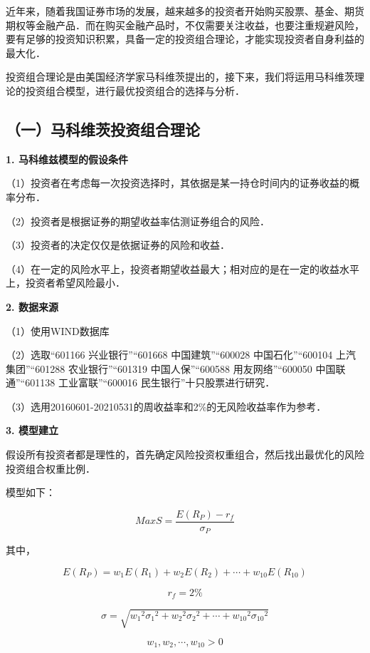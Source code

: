 
近年来，随着我国证券市场的发展，越来越多的投资者开始购买股票、基金、期货期权等金融产品．而在购买金融产品时，不仅需要关注收益，也要注重规避风险，要有足够的投资知识积累，具备一定的投资组合理论，才能实现投资者自身利益的最大化．

投资组合理论是由美国经济学家马科维茨提出的，接下来，我们将运用马科维茨理论的投资组合模型，进行最优投资组合的选择与分析．

\subsection{（一）马科维茨投资组合理论}

\textbf{1. 马科维兹模型的假设条件}

（1）投资者在考虑每一次投资选择时，其依据是某一持仓时间内的证券收益的概率分布．

（2）投资者是根据证券的期望收益率估测证券组合的风险．

（3）投资者的决定仅仅是依据证券的风险和收益．

（4）在一定的风险水平上，投资者期望收益最大；相对应的是在一定的收益水平上，投资者希望风险最小．

\textbf{2.	数据来源}

（1）使用WIND数据库

（2）选取“601166 兴业银行”“601668 中国建筑”“600028 中国石化”“600104 上汽集团”“601288 农业银行”“601319 中国人保”“600588 用友网络”“600050 中国联通”“601138 工业富联”“600016 民生银行”十只股票进行研究．

（3）选用20160601-20210531的周收益率和2\%的无风险收益率作为参考．

\textbf{3.	模型建立}

假设所有投资者都是理性的，首先确定风险投资权重组合，然后找出最优化的风险投资组合权重比例．

模型如下：

\begin{equation}
Max S=\frac {E(R_P)-r_f}{\sigma_P}
\end{equation}

其中，

\begin{equation}
E(R_P)=w_1E(R_1)+w_2E(R_2)+\cdots+w_{10}E(R_{10})
\end{equation}

\begin{equation}
r_f=2\%
\end{equation}

\begin{equation}
\sigma=\sqrt{{w_1}^2 {\sigma_1}^2 + {w_2}^2 {\sigma_2}^2 + \cdots +{w_{10}}^2 {\sigma_{10}}^2}
\end{equation}

\begin{equation}
w_1,w_2,\cdots,w_{10}>0
\end{equation}







